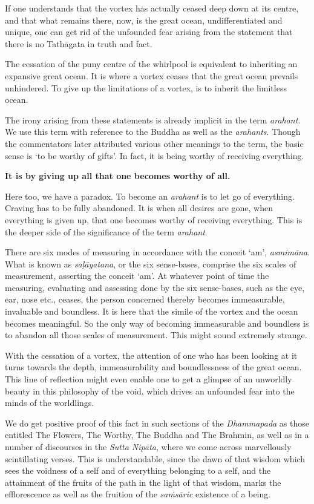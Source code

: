 If one understands that the vortex has actually ceased deep down at its centre, and that what remains there, now, is the great ocean, undifferentiated and unique, one can get rid of the unfounded fear arising from the statement that there is no Tathāgata in truth and fact.

The cessation of the puny centre of the whirlpool is equivalent to inheriting an expansive great ocean. It is where a vortex ceases that the great ocean prevails unhindered. To give up the limitations of a vortex, is to inherit the limitless ocean.

The irony arising from these statements is already implicit in the term \emph{arahant}. We use this term with reference to the Buddha as well as the \emph{arahants}. Though the commentators later attributed various other meanings to the term, the basic sense is `to be worthy of gifts'. In fact, it is being worthy of receiving everything.

\textbf{It is by giving up all that one becomes worthy of all.}

Here too, we have a paradox. To become an \emph{arahant} is to let go of everything. Craving has to be fully abandoned. It is when all desires are gone, when everything is given up, that one becomes worthy of receiving everything. This is the deeper side of the significance of the term \emph{arahant}.

There are six modes of measuring in accordance with the conceit `am', \emph{asmimāna}. What is known as \emph{saḷāyatana}, or the six sense-bases, comprise the six scales of measurement, asserting the conceit `am'. At whatever point of time the measuring, evaluating and assessing done by the six sense-bases, such as the eye, ear, nose etc., ceases, the person concerned thereby becomes immeasurable, invaluable and boundless. It is here that the simile of the vortex and the ocean becomes meaningful. So the only way of becoming immeasurable and boundless is to abandon all those scales of measurement. This might sound extremely strange.

With the cessation of a vortex, the attention of one who has been looking at it turns towards the depth, immeasurability and boundlessness of the great ocean. This line of reflection might even enable one to get a glimpse of an unworldly beauty in this philosophy of the void, which drives an unfounded fear into the minds of the worldlings.

We do get positive proof of this fact in such sections of the \emph{Dhammapada} as those entitled The Flowers, The Worthy, The Buddha and The Brahmin, as well as in a number of discourses in the \emph{Sutta Nipāta}, where we come across marvellously scintillating verses. This is understandable, since the dawn of that wisdom which sees the voidness of a self and of everything belonging to a self, and the attainment of the fruits of the path in the light of that wisdom, marks the efflorescence as well as the fruition of the \emph{saṁsāric} existence of a being.

